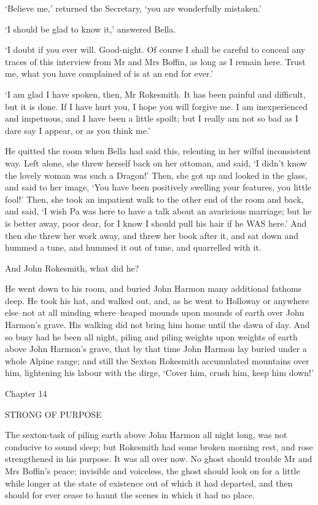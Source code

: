 ‘Believe me,’ returned the Secretary, ‘you are wonderfully mistaken.’

‘I should be glad to know it,’ answered Bella.

‘I doubt if you ever will. Good-night. Of course I shall be careful to
conceal any traces of this interview from Mr and Mrs Boffin, as long as
I remain here. Trust me, what you have complained of is at an end for
ever.’

‘I am glad I have spoken, then, Mr Rokesmith. It has been painful and
difficult, but it is done. If I have hurt you, I hope you will forgive
me. I am inexperienced and impetuous, and I have been a little spoilt;
but I really am not so bad as I dare say I appear, or as you think me.’

He quitted the room when Bella had said this, relenting in her wilful
inconsistent way. Left alone, she threw herself back on her ottoman, and
said, ‘I didn’t know the lovely woman was such a Dragon!’ Then, she
got up and looked in the glass, and said to her image, ‘You have been
positively swelling your features, you little fool!’ Then, she took an
impatient walk to the other end of the room and back, and said, ‘I
wish Pa was here to have a talk about an avaricious marriage; but he
is better away, poor dear, for I know I should pull his hair if he WAS
here.’ And then she threw her work away, and threw her book after
it, and sat down and hummed a tune, and hummed it out of tune, and
quarrelled with it.

And John Rokesmith, what did he?

He went down to his room, and buried John Harmon many additional fathoms
deep. He took his hat, and walked out, and, as he went to Holloway or
anywhere else--not at all minding where--heaped mounds upon mounds of
earth over John Harmon’s grave. His walking did not bring him home until
the dawn of day. And so busy had he been all night, piling and piling
weights upon weights of earth above John Harmon’s grave, that by that
time John Harmon lay buried under a whole Alpine range; and still the
Sexton Rokesmith accumulated mountains over him, lightening his labour
with the dirge, ‘Cover him, crush him, keep him down!’



Chapter 14

STRONG OF PURPOSE


The sexton-task of piling earth above John Harmon all night long, was
not conducive to sound sleep; but Rokesmith had some broken morning
rest, and rose strengthened in his purpose. It was all over now. No
ghost should trouble Mr and Mrs Boffin’s peace; invisible and voiceless,
the ghost should look on for a little while longer at the state of
existence out of which it had departed, and then should for ever cease
to haunt the scenes in which it had no place.


